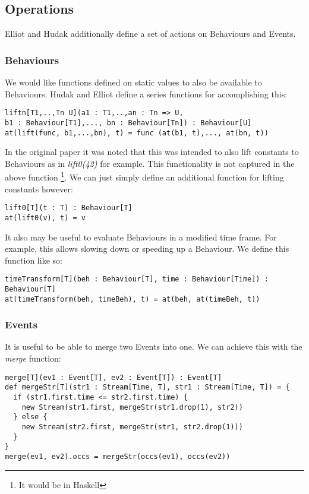    \subsection{Operations}
      Elliot and Hudak additionally define a set of actions on Behaviours and Events.
      
      \subsubsection{Behaviours}
        We would like functions defined on static values to also be available to Behaviours. Hudak
        and Elliot define a series functions for accomplishing this:
        
\begin{verbatim}
liftn[T1,..,Tn U](a1 : T1,..,an : Tn => U, 
b1 : Behaviour[T1],..., bn : Behaviour[Tn]) : Behaviour[U]
at(lift(func, b1,...,bn), t) = func (at(b1, t),..., at(bn, t))
\end{verbatim}

      In the original paper it was noted that this was intended to also lift constants to Behaviours
      as in \emph{lift0(42)} for example. This functionality is not captured in the above function \footnote{It would
      be in Haskell}. We can just simply define an additional function for lifting constants however:

\begin{verbatim}
lift0[T](t : T) : Behaviour[T]
at(lift0(v), t) = v
\end{verbatim}
        
       It also may be useful to evaluate Behaviours in a modified time frame. For example, this allows
       slowing down or speeding up a Behaviour. We define this function like so:

\begin{verbatim}
timeTransform[T](beh : Behaviour[T], time : Behaviour[Time]) : Behaviour[T]
at(timeTransform(beh, timeBeh), t) = at(beh, at(timeBeh, t))
\end{verbatim}
        
      \subsubsection{Events}
        It is useful to be able to merge two Events into one. We can achieve this with the \emph{merge} function:

\begin{verbatim}
merge[T](ev1 : Event[T], ev2 : Event[T]) : Event[T]
def mergeStr[T](str1 : Stream[Time, T], str1 : Stream[Time, T]) = {
  if (str1.first.time <= str2.first.time) {
    new Stream(str1.first, mergeStr(str1.drop(1), str2))
  } else {
    new Stream(str2.first, mergeStr(str1, str2.drop(1)))
  }
}
merge(ev1, ev2).occs = mergeStr(occs(ev1), occs(ev2))
\end{verbatim}            


